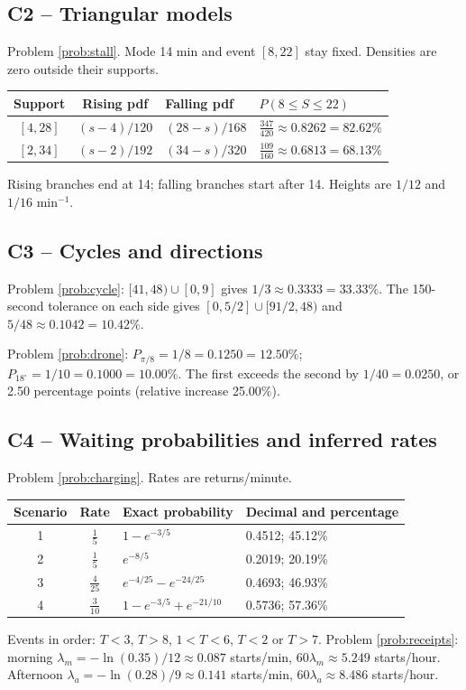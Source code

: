 \subsection*{C2 -- Triangular models}
Problem \ref{prob:stall}. Mode 14 min and event $[8,22]$ stay fixed. Densities are zero outside their supports.
\begin{center}\begin{tabular}{ccll}
\toprule Support&Rising pdf&Falling pdf&$P(8\le S\le22)$\\\midrule

$[4,28]$&$(s-4)/120$&$(28-s)/168$&$\frac{347}{420}\approx0.8262=82.62\%$\\

$[2,34]$&$(s-2)/192$&$(34-s)/320$&$\frac{109}{160}\approx0.6813=68.13\%$\\

\bottomrule\end{tabular}\end{center}
Rising branches end at 14; falling branches start after 14. Heights are $1/12$ and $1/16$ min$^{-1}$.
\clearpage\subsection*{C3 -- Cycles and directions}
Problem \ref{prob:cycle}: $[41,48)\cup[0,9]$ gives $1/3\approx0.3333=33.33\%$.
The 150-second tolerance on each side gives $[0,5/2]\cup[91/2,48)$ and $5/48\approx0.1042=10.42\%$.

Problem \ref{prob:drone}: $P_{\pi/8}=1/8=0.1250=12.50\%$; $P_{18^\circ}=1/10=0.1000=10.00\%$.
The first exceeds the second by $1/40=0.0250$, or 2.50 percentage points (relative increase 25.00\%).
\subsection*{C4 -- Waiting probabilities and inferred rates}
Problem \ref{prob:charging}. Rates are returns/minute.
\begin{center}\begin{tabular}{ccll}\toprule Scenario&Rate&Exact probability&Decimal and percentage\\\midrule

1&$\frac{1}{5}$&$1-e^{-3/5}$&0.4512; 45.12\%\\

2&$\frac{1}{5}$&$e^{-8/5}$&0.2019; 20.19\%\\

3&$\frac{4}{25}$&$e^{-4/25}-e^{-24/25}$&0.4693; 46.93\%\\

4&$\frac{3}{10}$&$1-e^{-3/5}+e^{-21/10}$&0.5736; 57.36\%\\

\bottomrule\end{tabular}\end{center}
Events in order: $T<3$, $T>8$, $1<T<6$, $T<2\text{ or }T>7$.
Problem \ref{prob:receipts}: morning $\lambda_m=-\ln(0.35)/12\approx0.087$ starts/min, $60\lambda_m\approx5.249$ starts/hour.
Afternoon $\lambda_a=-\ln(0.28)/9\approx0.141$ starts/min, $60\lambda_a\approx8.486$ starts/hour.

